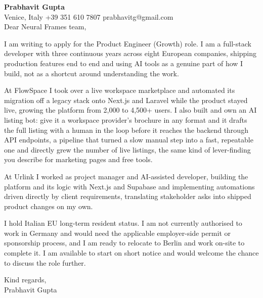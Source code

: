 \documentclass[a4paper,10.5pt]{article}
\begin{document}
\textbf{Prabhavit Gupta}\\
Venice, Italy \textbar{} +39 351 610 7807 \textbar{} prabhavitg@gmail.com\\[10pt]
Dear Neural Frames team,

I am writing to apply for the Product Engineer (Growth) role. I am a full-stack developer with three continuous years across eight European companies, shipping production features end to end and using AI tools as a genuine part of how I build, not as a shortcut around understanding the work.

At FlowSpace I took over a live workspace marketplace and automated its migration off a legacy stack onto Next.js and Laravel while the product stayed live, growing the platform from 2,000 to 4,500+ users. I also built and own an AI listing bot: give it a workspace provider's brochure in any format and it drafts the full listing with a human in the loop before it reaches the backend through API endpoints, a pipeline that turned a slow manual step into a fast, repeatable one and directly grew the number of live listings, the same kind of lever-finding you describe for marketing pages and free tools.

At Urlink I worked as project manager and AI-assisted developer, building the platform and its logic with Next.js and Supabase and implementing automations driven directly by client requirements, translating stakeholder asks into shipped product changes on my own.

I hold Italian EU long-term resident status. I am not currently authorised to work in Germany and would need the applicable employer-side permit or sponsorship process, and I am ready to relocate to Berlin and work on-site to complete it. I am available to start on short notice and would welcome the chance to discuss the role further.

Kind regards,\\
Prabhavit Gupta
\end{document}
